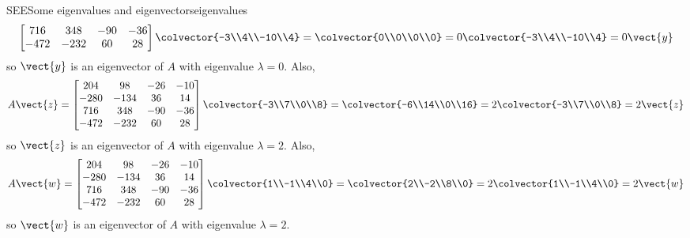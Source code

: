 \begin{example}{SEE}{Some eigenvalues and eigenvectors}{eigenvalues}
\begin{equation*}
\begin{bmatrix}
716 & 348 & -90 & -36\\
-472 & -232 & 60 & 28
\end{bmatrix}
\colvector{-3\\4\\-10\\4}=
\colvector{0\\0\\0\\0}=
0\colvector{-3\\4\\-10\\4}=0\vect{y}
%
\end{equation*}
%
so $\vect{y}$ is an eigenvector of $A$ with eigenvalue $\lambda=0$.  Also,
%
\begin{equation*}
A\vect{z}=
\begin{bmatrix}
204 & 98 & -26 & -10\\
-280 & -134 & 36 & 14\\
716 & 348 & -90 & -36\\
-472 & -232 & 60 & 28
\end{bmatrix}
\colvector{-3\\7\\0\\8}=
\colvector{-6\\14\\0\\16}=
2\colvector{-3\\7\\0\\8}=2\vect{z}
\end{equation*}
%
so $\vect{z}$ is an eigenvector of $A$ with eigenvalue $\lambda=2$.  Also,
%
\begin{equation*}
A\vect{w}=
\begin{bmatrix}
204 & 98 & -26 & -10\\
-280 & -134 & 36 & 14\\
716 & 348 & -90 & -36\\
-472 & -232 & 60 & 28
\end{bmatrix}
\colvector{1\\-1\\4\\0}=
\colvector{2\\-2\\8\\0}=
2\colvector{1\\-1\\4\\0}=2\vect{w}
\end{equation*}
%
so $\vect{w}$ is an eigenvector of $A$ with eigenvalue $\lambda=2$.\par

\end{example}
